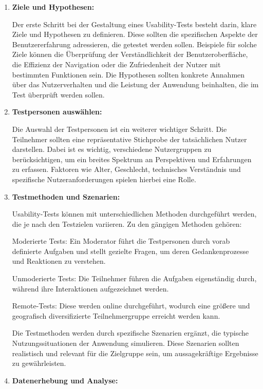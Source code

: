 \begin{enumerate}
    \item \textbf{Ziele und Hypothesen:}

Der erste Schritt bei der Gestaltung eines Usability-Tests besteht darin, klare Ziele und Hypothesen zu definieren. Diese sollten die spezifischen Aspekte der Benutzererfahrung adressieren, die getestet werden sollen. Beispiele für solche Ziele können die Überprüfung der Verständlichkeit der Benutzeroberfläche, die Effizienz der Navigation oder die Zufriedenheit der Nutzer mit bestimmten Funktionen sein. Die Hypothesen sollten konkrete Annahmen über das Nutzerverhalten und die Leistung der Anwendung beinhalten, die im Test überprüft werden sollen.

    \item \textbf{Testpersonen auswählen:}

Die Auswahl der Testpersonen ist ein weiterer wichtiger Schritt. Die Teilnehmer sollten eine repräsentative Stichprobe der tatsächlichen Nutzer darstellen. Dabei ist es wichtig, verschiedene Nutzergruppen zu berücksichtigen, um ein breites Spektrum an Perspektiven und Erfahrungen zu erfassen. Faktoren wie Alter, Geschlecht, technisches Verständnis und spezifische Nutzeranforderungen spielen hierbei eine Rolle.


    \item \textbf{Testmethoden und Szenarien:}

Usability-Tests können mit unterschiedlichen Methoden durchgeführt werden, die je nach den Testzielen variieren. Zu den gängigen Methoden gehören:

Moderierte Tests: Ein Moderator führt die Testpersonen durch vorab definierte Aufgaben und stellt gezielte Fragen, um deren Gedankenprozesse und Reaktionen zu verstehen.

Unmoderierte Tests: Die Teilnehmer führen die Aufgaben eigenständig durch, während ihre Interaktionen aufgezeichnet werden.

Remote-Tests: Diese werden online durchgeführt, wodurch eine größere und geografisch diversifizierte Teilnehmergruppe erreicht werden kann.

Die Testmethoden werden durch spezifische Szenarien ergänzt, die typische Nutzungssituationen der Anwendung simulieren. Diese Szenarien sollten realistisch und relevant für die Zielgruppe sein, um aussagekräftige Ergebnisse zu gewährleisten.


    \item \textbf{Datenerhebung und Analyse:}


\end{enumerate}
